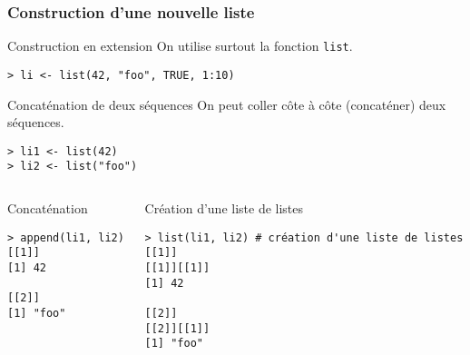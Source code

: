 \documentclass[10pt]{beamer}
\begin{document}
\begin{frame}[fragile]
  \frametitle{Construction d'une nouvelle liste}
  \begin{alertblock}{Construction en extension}
    On utilise surtout la fonction \alert{\texttt{list}}.
    \begin{lstlisting}
> li <- list(42, "foo", TRUE, 1:10)
\end{lstlisting}
  \end{alertblock}

  \begin{block}{Concaténation de deux séquences}
    On peut coller côte à côte (concaténer) deux séquences.
    \begin{lstlisting}
> li1 <- list(42)
> li2 <- list("foo")
\end{lstlisting}
\end{block}

\vspace{-15pt}
\begin{columns}[t]
  \begin{column}{0.48\textwidth}
    \begin{block}{Concaténation}
    \begin{lstlisting}[style=block]
> append(li1, li2)
[[1]]
[1] 42

[[2]]
[1] "foo"
\end{lstlisting}
\end{block}

\end{column}
\begin{column}{0.48\textwidth}
  \begin{block}{Création d'une liste de listes}
    \begin{lstlisting}[style=block]
> list(li1, li2) # création d'une liste de listes
[[1]]
[[1]][[1]]
[1] 42

[[2]]
[[2]][[1]]
[1] "foo"
\end{lstlisting}
  \end{block}
\end{column}
\end{columns}


\end{frame}
\end{document}
